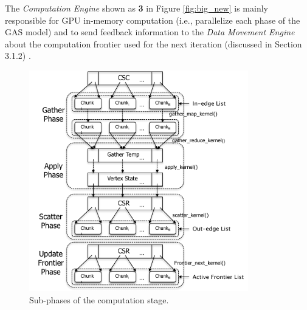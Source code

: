 The \textit{Computation Engine} shown as \textbf{3} in Figure \ref{fig:big_new} is mainly responsible for GPU in-memory computation (i.e., parallelize each 
phase of the GAS model) and to send feedback information to the \textit{Data Movement Engine} about the computation frontier 
used for the next iteration (discussed in Section 3.1.2) .

\begin{figure}[!t]
\centering
\includegraphics[width=0.85\textwidth,height=\textheight,keepaspectratio]{figures/fivephases.pdf}
\caption{Sub-phases of  the computation stage.  }
\label{fig:5phases}
\end{figure}

